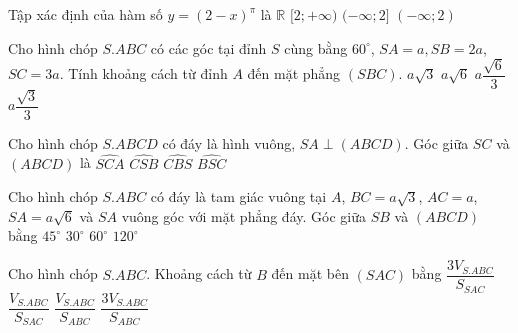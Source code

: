 \begin{ex}%
Tập xác định của hàm số $y=(2-x)^{\pi}$ là
\choice
{$\mathbb{R}$}
{$[2;+\infty)$}
{$(-\infty;2]$}
{\True $(-\infty;2)$}
\end{ex}

\begin{ex}%
Cho hình chóp $S.ABC$ có các góc tại đỉnh $S$ cùng bằng $60^{\circ}$, $SA=a, SB=2a$, $SC=3a$. Tính khoảng cách từ đỉnh $A$ đến mặt phẳng $(SBC)$.
\choice
{$a\sqrt{3}$}
{$a\sqrt{6}$}
{\True $a\dfrac{\sqrt{6}}{3}$}
{$a\dfrac{\sqrt{3}}{3}$}
\end{ex}

\begin{ex}%
Cho hình chóp $S.ABCD$ có đáy là hình vuông, $SA\perp (ABCD)$. Góc giữa $SC$ và $(ABCD)$ là 
\choice
{\True $\widehat{SCA}$}
{$\widehat{CSB}$}
{$\widehat{CBS}$}
{$\widehat{BSC}$}
\end{ex}

\begin{ex}%
Cho hình chóp $S.ABC$ có đáy là tam giác vuông tại $A$, $BC=a\sqrt{3}$, $AC=a$, $SA=a\sqrt{6}$ và $SA$ vuông góc với mặt phẳng đáy. Góc giữa $SB$ và $(ABCD)$ bằng
\choice
{$45^{\circ}$}
{$30^{\circ}$}
{\True $60^{\circ}$}
{$120^{\circ}$}
\end{ex}

\begin{ex}%
Cho hình chóp $S.ABC$. Khoảng cách từ $B$ đến mặt bên $(SAC)$ bằng
\choice
{\True $\dfrac{3V_{S.ABC}}{S_{SAC}}$}
{$\dfrac{V_{S.ABC}}{S_{SAC}}$}
{$\dfrac{V_{S.ABC}}{S_{ABC}}$}
{$\dfrac{3V_{S.ABC}}{S_{ABC}}$}
\end{ex}

